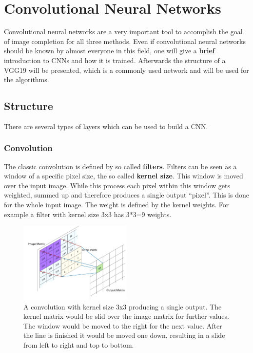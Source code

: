 \documentclass[
     11pt,         %
     a4paper,      %
     oneside,
     ]{article}
\begin{document}
\section{Convolutional Neural Networks}
Convolutional neural networks are a very important tool to accomplish the goal of image completion for all three methods. Even if convolutional neural networks should be known by almost everyone in this field, one will give a \underline{\textbf{brief}} introduction to CNNs and how it is trained. Afterwards the structure of a VGG19 will be presented, which is a commonly used network and will be used for the algorithms.
\subsection{Structure}
There are several types of layers which can be used to build a CNN.
\subsubsection{Convolution}
The classic convolution is defined by so called \textbf{filters}. Filters can be seen as a window of a specific pixel size, the so called \textbf{kernel size}. This window is moved over the input image. While this process each pixel within this window gets weighted, summed up and therefore produces a single output \enquote{pixel}. This is done for the whole input image. The weight is defined by the kernel weights. For example a filter with kernel size 3x3 has 3*3=9 weights.
\begin{figure}[H]
  \begin{center}
    \includegraphics[width=0.5\textwidth]{images/1.JPG}
    \caption{A convolution with kernel size 3x3 producing a single output. The kernel matrix would be slid over the image matrix for further values. The window would be moved to the right for the next value. After the line is finished it would be moved one down, resulting in a slide from left to right and top to bottom.}
    \label{fig:conv}
  \end{center}
\end{figure}
\end{document}
